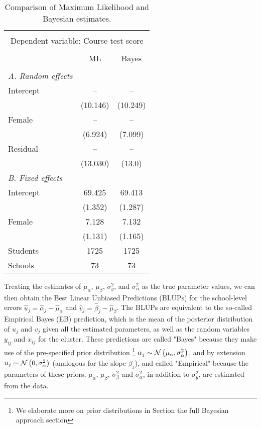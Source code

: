 \begin{table}[H]
	\centering
	\caption{{\small Comparison of Maximum Likelihood and Bayesian estimates.}}
	\label{}
	
	\smallskip
	\begin{tabular}{l*{2}{c}}
		\toprule \\[-1.0em]
		\multicolumn{3}{c}{Dependent variable: Course test score}\\ \\[-1.0em]
		&ML &Bayes\\
		\midrule \\[-1.0em]
		\emph{A. Random effects}\\
		Intercept & -- & --\\
		& (10.146) & (10.249)\\
		Female & -- & --\\
		& (6.924) & (7.099)\\
		Residual & -- & --\\
		& (13.030) & (13.0)\\
		\emph{B. Fixed effects} \\
		Intercept & 69.425 & 69.413\\
		& (1.352) & (1.287)\\
		Female & 7.128 & 7.132\\
		& (1.131) & (1.165)\\
		\hline
		Students&1725&1725\\
		Schools&73&73\\
		\bottomrule
		
	\end{tabular}
	\label{tab:results}
\end{table}
Treating the estimates of $\mu_\alpha$, $\mu_\beta$, $\sigma^2_{y}$, and $\sigma^2_{\alpha}$ as the true parameter values, we can then obtain the Best Linear Unbiased Predictions (BLUPs) for the school-level errors $\hat{u}_j = \hat{\alpha}_{j} - \hat{\mu}_{\alpha}$ and $\hat{v}_j = \hat{\beta}_{j} - \hat{\mu}_{\beta}$. The BLUPs are equivalent to the so-called Empirical Bayes (EB) prediction, which is the mean of the posterior distribution of $u_{j}$ and $v_{j}$ given all the estimated parameters, as well as the random variables $y_{ij}$ and $x_{ij}$ for the cluster.  These predictions are called "Bayes" because they make use of the pre-specified prior distribution \footnote{We elaborate more on prior distributions in Section the full Bayesian approach section} $\alpha_j \sim \mathcal{N}\left(\mu_\alpha, \sigma^2_\alpha\right)$, and by extension $u_j \sim \mathcal{N}\left(0, \sigma^2_\alpha\right)$ (analogous for the slope $\beta_j$), and called "Empirical" because the parameters of these priors, $\mu_\alpha$, $\mu_\beta$,  $\sigma^2_{\beta}$ and $\sigma^2_{\alpha}$, in addition to $\sigma^2_{y}$, are estimated from the data.

